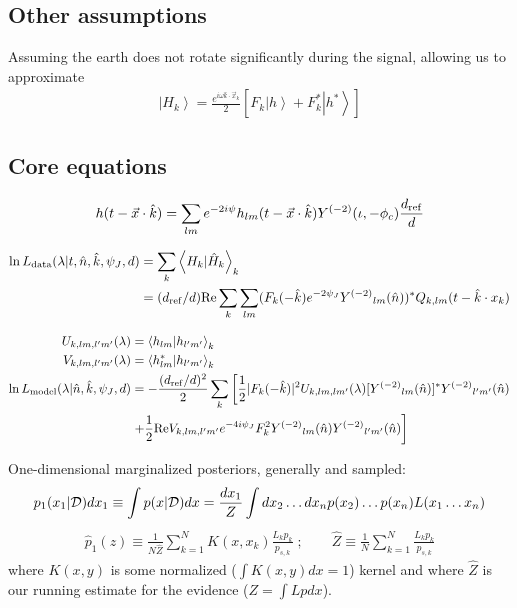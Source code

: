 \documentclass[twocolumn,prd,nofootinbib]{revtex4}
\newcommand\Y[1]{Y^{(#1)}{}}
\newcommand\qmstate[1]{\left|#1\right \rangle}
\newcommand\qmstateproduct[2]{\left\langle#1|#2\right\rangle}
\begin{document}
\subsection{Other assumptions}
Assuming the earth does not rotate significantly during the signal, allowing us to approximate
\begin{eqnarray}
\qmstate{H_k} = \frac{e^{i\omega \hat{k}\cdot \vec{x}_k}}{2}\left[ 
   F_k  \qmstate{h} + F_k^* \qmstate{h^*} 
 \right]
\end{eqnarray}


\begin{widetext}
\subsection{Core equations}

\begin{align}
\label{eq:h:Expansion}
h(t-\vec{x}\cdot \hat{k}) = \sum_{lm} e^{-2i\psi} h_{lm}(t-\vec{x}\cdot \hat{k})  \Y{-2}(\iota,-\phi_c)  \frac{d_{\rm ref}}{d}
\end{align}

\begin{align}
\ln L_{\rm data}(\lambda|t,\hat{n},\hat{k},\psi_J,d) &=  \sum_k\qmstateproduct{H_k}{\hat{H}_k}_k \nonumber \\
\label{eq:Implementation:lnLData}
&= (d_{\rm ref}/d) \text{Re} \sum_k \sum_{lm}(F_k(-\hat{k}) e^{-2\psi_J} \Y{-2}_{lm}(\hat{n}))^* Q_{k,lm}(t-\hat{k}\cdot x_k)
\end{align}

\begin{subequations}
\label{eq:ComputeRhoViaInnerProductMatrix}
\begin{align}
{ U_{k,lm,l'm'}(\lambda)}& = \qmstateproduct{h_{lm}}{h_{l'm'}}_k \\
V_{k,lm,l'm'}(\lambda)& = \qmstateproduct{h_{lm}^*}{h_{l'm'}}_k \\
\ln L_{\rm model}(\lambda|\hat{n},\hat{k},\psi_J,d) &=
   -\frac{(d_{\rm ref}/d)^2}{2}\sum_k
\left[
{
 \frac{1}{2}|F_k(-\hat{k})|^2 U_{k,lm,lm'}(\lambda)[\Y{-2}_{lm}(\hat{n})]^*\Y{-2}_{l'm'}(\hat{n})
}
 \right. \nonumber \\ & \left.
 {
+
 \frac{1}{2} \text{Re} V_{k,lm,l'm'} e^{-4i\psi_J}F_k^2 \Y{-2}_{lm}(\hat{n})\Y{-2}_{l'm'}(\hat{n})
}
\right]
\end{align}
\end{subequations}


One-dimensional marginalized posteriors, generally and sampled: 
\begin{eqnarray}
p_1(x_1|{\cal D}) dx_1 \equiv \int p(x|{\cal D}) dx = \frac{dx_1}{Z} \int dx_{2}\ldots dx_n p(x_2)\ldots p(x_n)L(x_1\ldots x_n) 
\end{eqnarray}
\begin{eqnarray}
\hat{p}_1(z) \equiv \frac{1}{N \hat{Z}}\sum_{k=1}^N K(x,x_k) \frac{L_k p_k}{p_{s,k}} 
\; ; \qquad
\hat{Z} \equiv \frac{1}{N} \sum_{k=1}^N \frac{L_k p_k}{p_{s,k}}
\end{eqnarray}
where $K(x,y)$ is some normalized ($\int K(x,y) dx = 1$) kernel  and where $\hat{Z}$ is our running
estimate for the evidence ($Z = \int L p dx$).


\end{widetext}
\end{document}
